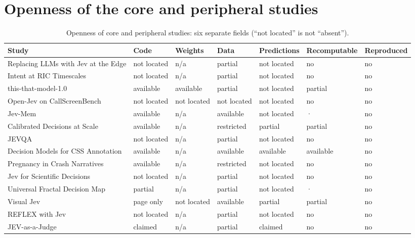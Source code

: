 \section{Openness of the core and peripheral studies}\label{sec:appendix-c-openness-of-the-core-and-peripheral-studies}

\begin{table}[tbp]
\centering\footnotesize
\caption{Openness of core and peripheral studies: six separate fields (“not located” is not “absent”).}\label{tab:openness}
\begin{tabularx}{\linewidth}{Xllllll}
\toprule
\textbf{Study} & \textbf{Code} & \textbf{Weights} & \textbf{Data} & \textbf{Predictions} & \textbf{Recomputable} & \textbf{Reproduced} \\
\midrule
Replacing LLMs with Jev at the Edge & not located & n/\allowbreak{}a & partial & not located & no & no \\
Intent at RIC Timescales & not located & n/\allowbreak{}a & partial & not located & no & no \\
this-that-model-1.0 & available & available & partial & not located & partial & no \\
Open-Jev on CallScreenBench & not located & not located & not located & not located & no & no \\
Jev-Mem & available & n/\allowbreak{}a & available & not located & · & no \\
Calibrated Decisions at Scale & available & n/\allowbreak{}a & restricted & partial & partial & no \\
JEVQA & not located & n/\allowbreak{}a & partial & not located & no & no \\
Decision Models for CSS Annotation & available & n/\allowbreak{}a & available & available & available & no \\
Pregnancy in Crash Narratives & available & n/\allowbreak{}a & restricted & not located & no & no \\
Jev for Scientific Decisions & not located & n/\allowbreak{}a & partial & not located & no & no \\
Universal Fractal Decision Map & partial & n/\allowbreak{}a & partial & not located & · & no \\
Visual Jev & page only & not located & available & partial & partial & no \\
REFLEX with Jev & not located & n/\allowbreak{}a & partial & not located & no & no \\
JEV-as-a-Judge & claimed & n/\allowbreak{}a & partial & claimed & no & no \\

\end{tabularx}
\end{table}
